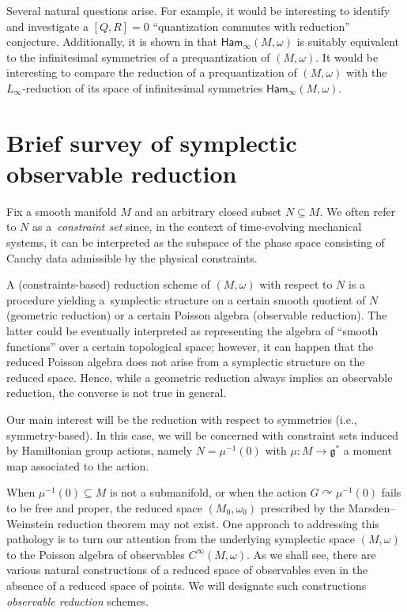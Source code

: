 \documentclass[10pt,a4paper]{amsart}
\numberwithin{equation}{section}
\newcommand{\Ham}{\mathsf{Ham}}
\renewcommand{\subset}{\subseteq}
\begin{document}
Several natural questions arise. For example, it would be interesting to identify and investigate a $[Q,R]=0$ ``quantization commutes with reduction'' conjecture. Additionally, it is shown in \cite{FiorenzaRogersSchreiber14} that $\Ham_\infty(M,\omega)$ is suitably equivalent to the infinitesimal symmetries of a prequantization of $(M,\omega)$. It would be interesting to compare the reduction of a prequantization of $(M,\omega)$ with the $L_\infty$-reduction of its space of infinitesimal symmetries $\Ham_\infty(M,\omega)$.

\appendix

\section{Brief survey of symplectic observable reduction}\label{Sec:SymSingRed}

Fix a smooth manifold $M$ and an arbitrary closed subset $N\subset M$.
We often refer to $N$ as a~\emph{constraint set} since, in the context of time-evolving mechanical systems, it can be interpreted as the subspace of the phase space consisting of Cauchy data admissible by the physical constraints.

A (constraints-based) reduction scheme of  $(M,\omega)$  with respect to $N$ is a procedure yielding a~symplectic structure on a certain smooth quotient of $N$ (geometric reduction) or a certain Poisson algebra (observable reduction).
The latter could be eventually interpreted as representing the algebra of ``smooth functions'' over a certain topological space; however, it can happen that the reduced Poisson algebra does not arise from a symplectic structure on the reduced space.
Hence,  while a geometric reduction always implies an observable reduction, the converse is not true in general.

Our main interest will be the reduction with respect to symmetries (i.e., symmetry-based). In this case, we will be concerned with constraint sets induced by Hamiltonian group actions, namely $N=\mu^{-1}(0)$ with $\mu\colon M\to \mathfrak{g}^\ast $ a moment map associated to the action.

When $\mu^{-1}(0)\subset M$ is not a submanifold, or when the action $G\curvearrowright\mu^{-1}(0)$ fails to be free and proper, the reduced space $(M_0,\omega_0)$ prescribed by the Marsden--Weinstein reduction theorem may not exist.
%
One approach to addressing this pathology is to turn our attention from the underlying symplectic space $(M,\omega)$ to the Poisson algebra of observables $C^\infty(M,\omega)$. As we shall see, there are various natural constructions of a reduced space of observables even in the absence of a reduced space of points. We will designate such constructions \emph{observable reduction} schemes.
\end{document}
